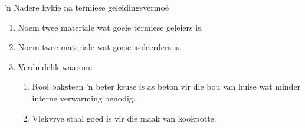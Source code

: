 \begin{Investigation}{ 'n Nadere kykie na termiese geleidingsvermo\"e}
{      \label{m38706*id67013}\begin{enumerate}[noitemsep, label=\textbf{\arabic*}. ] 
            \label{m38706*uid105}\item Noem twee materiale wat goeie termiese geleiers is.
\label{m38706*uid106}\item Noem twee materiale wat goeie isoleerders is.
\label{m38706*uid107}\item Verduidelik waarom:
\label{m38706*id67053}\begin{enumerate}[noitemsep, label=\textbf{\alph*}. ] 
            \label{m38706*uid108}\item Rooi baksteen 'n beter keuse is as beton vir die bou van huise wat minder interne verwarming benodig.
\label{m38706*uid109}\item Vlekvrye staal goed is vir die maak van kookpotte.
\end{enumerate}
        \end{enumerate}}
\end{Investigation}
\label{m38706*notfhsst!!!underscore!!!id564}
	\par
    \label{m38706*cid8}
